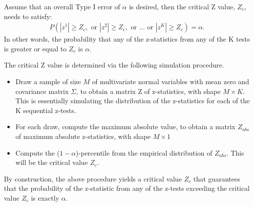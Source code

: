 \documentclass[final,3p,times]{elsarticle}
\begin{document}
Assume that an overall Type I error of $\alpha$ is desired, then the critical Z value, $Z_c$, needs to satisfy:
\begin{align*}
P(|z^1| \geq Z_c, \mbox{ or } |z^2| \geq Z_c, \mbox{ or } ... \mbox{ or }|z^K| \geq Z_c) = \alpha.
\end{align*}
In other words, the probability that any of the z-statistics from any of the K tests is greater or equal to $Z_c$ is $\alpha$.

The critical Z value is determined via the following simulation procedure.
\begin{itemize}
\item Draw a sample of size $M$ of multivariate normal variables with mean zero and covariance matrix $\Sigma$, to obtain a matrix Z of z-statistics, with shape $M\times K$. This is essentially simulating the distribution of the z-statistics for each of the K sequential z-tests.
\item For each draw, compute the maximum absolute value, to obtain a matrix $Z_{abs}$ of maximum absolute z-statistics, with shape  $M\times 1$
\item Compute the ($1-\alpha$)-percentile from the empirical distribution of $Z_{abs}$. This will be the critical value $Z_c$.
\end{itemize}

By construction, the above procedure yields a critical value $Z_c$ that guarantees that the probability of the z-statistic from any of the z-tests exceeding the critical value $Z_c$ is exactly $\alpha$.













\end{document}
